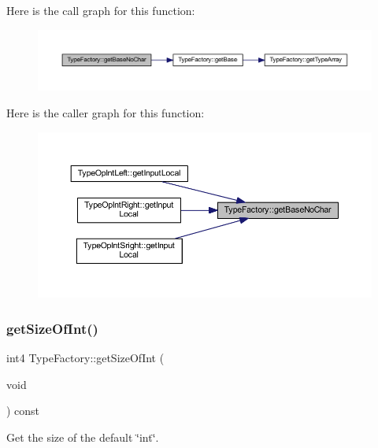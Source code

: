 Here is the call graph for this function\+:
\nopagebreak
\begin{figure}[H]
\begin{center}
\leavevmode
\includegraphics[width=350pt]{class_type_factory_adca2937f24e37c5ac19ba442cd1df0d8_cgraph}
\end{center}
\end{figure}
Here is the caller graph for this function\+:
\nopagebreak
\begin{figure}[H]
\begin{center}
\leavevmode
\includegraphics[width=350pt]{class_type_factory_adca2937f24e37c5ac19ba442cd1df0d8_icgraph}
\end{center}
\end{figure}
\mbox{\label{class_type_factory_a8a7d719707e81a56b9871272296e0893}} 
\subsubsection{\texorpdfstring{getSizeOfInt()}{getSizeOfInt()}}
{\footnotesize\ttfamily int4 Type\+Factory\+::get\+Size\+Of\+Int (\begin{DoxyParamCaption}\item[{void}]{ }\end{DoxyParamCaption}) const\hspace{0.3cm}{\ttfamily [inline]}}



Get the size of the default \char`\"{}int\char`\"{}. 



